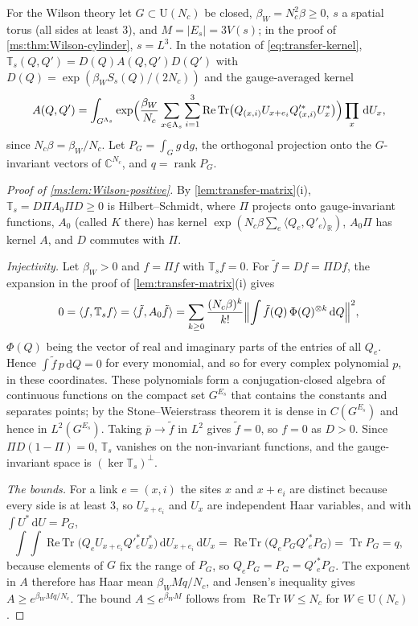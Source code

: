 \documentclass[11pt,a4paper]{amsart}
\theoremstyle{definition}
\theoremstyle{remark}
\numberwithin{equation}{section}
\DeclareMathOperator{\Tr}{Tr}        %
\DeclareMathOperator{\ReTr}{Re\,Tr}  %
\DeclareMathOperator{\rank}{rank}    %
\newcommand{\R}{\mathbb{R}}          %
\newcommand{\C}{\mathbb{C}}          %
\newcommand{\ip}[2]{\langle #1,#2\rangle}  %
\newcommand{\abs}[1]{\lvert #1\rvert}      %
\newcommand{\dd}{\,\mathrm{d}}             %
\newcommand{\U}{\mathrm{U}}                %
\newcommand{\TT}{\mathbb{T}}               %
\newcommand{\Vol}[1]{V(#1)}                %
\newcommand{\betaW}{\beta_{W}}             %
\begin{document}
For the Wilson theory let $G\subset\U(N_c)$ be closed, $\betaW=N_c^2\beta\ge0$, $s$ a spatial torus (all sides at least $3$), and $M=\abs{E_s}=3\Vol{s}$; in the proof of \cref{ms:thm:Wilson-cylinder}, $s=L^3$. In the notation of \eqref{eq:transfer-kernel}, $\TT_s(Q,Q')=D(Q)A(Q,Q')D(Q')$ with $D(Q)=\exp(\betaW S_s(Q)/(2N_c))$ and the gauge-averaged kernel
\[
A(Q,Q')=\int_{G^{\Lambda_s}}\exp\Bigl(\frac{\betaW}{N_c}\sum_{x\in\Lambda_s}\sum_{i=1}^3\ReTr\bigl(Q_{(x,i)}U_{x+e_i}Q'^{*}_{(x,i)}U_x^*\bigr)\Bigr)\prod_{x}\dd U_x ,
\]
since $N_c\beta=\betaW/N_c$. Let $P_G=\int_Gg\dd g$, the orthogonal projection onto the $G$-invariant vectors of $\C^{N_c}$, and $q=\rank P_G$.

\begin{proof}[Proof of \cref{ms:lem:Wilson-positive}]
By \cref{lem:transfer-matrix}(i), $\TT_s=D\Pi A_0\Pi D\ge0$ is Hilbert--Schmidt, where $\Pi$ projects onto gauge-invariant functions, $A_0$ (called $K$ there) has kernel $\exp(N_c\beta\sum_e\ip{Q_e}{Q'_e}_{\R})$, $A_0\Pi$ has kernel $A$, and $D$ commutes with $\Pi$.

\emph{Injectivity.} Let $\betaW>0$ and $f=\Pi f$ with $\TT_sf=0$. For $\tilde f=Df=\Pi Df$, the expansion in the proof of \cref{lem:transfer-matrix}(i) gives
\[
0=\ip{f}{\TT_sf}=\ip{\tilde f}{A_0\tilde f}=\sum_{k\ge0}\frac{(N_c\beta)^k}{k!}\Bigl\lVert\int\tilde f(Q)\,\Phi(Q)^{\otimes k}\dd Q\Bigr\rVert^2 ,
\]
$\Phi(Q)$ being the vector of real and imaginary parts of the entries of all $Q_e$. Hence $\int\tilde f\,p\dd Q=0$ for every monomial, and so for every complex polynomial $p$, in these coordinates. These polynomials form a conjugation-closed algebra of continuous functions on the compact set $G^{E_s}$ that contains the constants and separates points; by the Stone--Weierstrass theorem it is dense in $C(G^{E_s})$ and hence in $L^2(G^{E_s})$. Taking $\bar p\to\tilde f$ in $L^2$ gives $\tilde f=0$, so $f=0$ as $D>0$. Since $\Pi D(1-\Pi)=0$, $\TT_s$ vanishes on the non-invariant functions, and the gauge-invariant space is $(\ker\TT_s)^\perp$.

\emph{The bounds.} For a link $e=(x,i)$ the sites $x$ and $x+e_i$ are distinct because every side is at least $3$, so $U_{x+e_i}$ and $U_x$ are independent Haar variables, and with $\int U^*\dd U=P_G$,
\[
\int\!\!\int\ReTr\bigl(Q_eU_{x+e_i}Q'^*_eU_x^*\bigr)\dd U_{x+e_i}\dd U_x=\ReTr\bigl(Q_eP_GQ'^*_eP_G\bigr)=\Tr P_G=q ,
\]
because elements of $G$ fix the range of $P_G$, so $Q_eP_G=P_G=Q'^*_eP_G$. The exponent in $A$ therefore has Haar mean $\betaW Mq/N_c$, and Jensen's inequality gives $A\ge e^{\betaW Mq/N_c}$. The bound $A\le e^{\betaW M}$ follows from $\ReTr W\le N_c$ for $W\in\U(N_c)$.
\end{proof}
\end{document}
